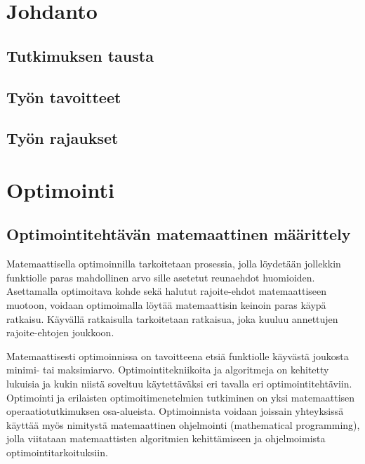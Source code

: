 \documentclass[12pt]{article}
\newenvironment{content}{\pagenumbering{arabic}}{}
\begin{document}
\begin{content}


\section{Johdanto}

\subsection{Tutkimuksen tausta}
\subsection{Työn tavoitteet}
\subsection{Työn rajaukset}

\section{Optimointi}
\subsection{Optimointitehtävän matemaattinen määrittely}

Matemaattisella optimoinnilla tarkoitetaan prosessia, jolla löydetään jollekkin funktiolle paras mahdollinen arvo sille asetetut reunaehdot huomioiden. Asettamalla optimoitava kohde sekä halutut rajoite-ehdot matemaattiseen muotoon, voidaan optimoimalla löytää matemaattisin keinoin paras käypä ratkaisu. Käyvällä ratkaisulla tarkoitetaan ratkaisua, joka kuuluu annettujen rajoite-ehtojen joukkoon. 

Matemaattisesti optimoinnissa on tavoitteena etsiä funktiolle käyvästä joukosta minimi- tai maksimiarvo. Optimointitekniikoita ja algoritmeja on kehitetty lukuisia ja kukin niistä soveltuu käytettäväksi eri tavalla eri optimointitehtäviin. Optimointi ja erilaisten optimoitimenetelmien tutkiminen on yksi matemaattisen operaatiotutkimuksen osa-alueista. Optimoinnista voidaan joissain yhteyksissä käyttää myös nimitystä matemaattinen ohjelmointi (mathematical programming), jolla viitataan matemaattisten algoritmien kehittämiseen ja ohjelmoimista optimointitarkoituksiin.  \parencite[1]{engopt}


\end{content}
\end{document}
